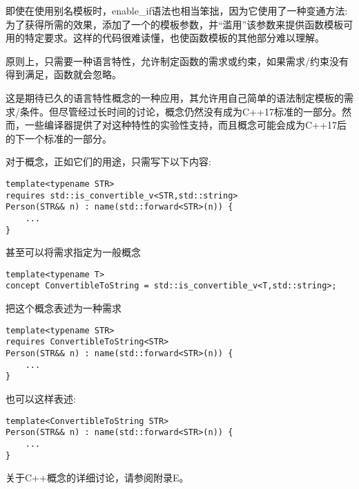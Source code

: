 即使在使用别名模板时，enable\_if语法也相当笨拙，因为它使用了一种变通方法:为了获得所需的效果，添加了一个的模板参数，并“滥用”该参数来提供函数模板可用的特定要求。这样的代码很难读懂，也使函数模板的其他部分难以理解。

原则上，只需要一种语言特性，允许制定函数的需求或约束，如果需求/约束没有得到满足，函数就会忽略。

这是期待已久的语言特性概念的一种应用，其允许用自己简单的语法制定模板的需求/条件。但尽管经过长时间的讨论，概念仍然没有成为C++17标准的一部分。然而，一些编译器提供了对这种特性的实验性支持，而且概念可能会成为C++17后的下一个标准的一部分。

对于概念，正如它们的用途，只需写下以下内容:

\begin{lstlisting}[style=styleCXX]
template<typename STR>
requires std::is_convertible_v<STR,std::string>
Person(STR&& n) : name(std::forward<STR>(n)) {
	...
}
\end{lstlisting}

甚至可以将需求指定为一般概念

\begin{lstlisting}[style=styleCXX]
template<typename T>
concept ConvertibleToString = std::is_convertible_v<T,std::string>;
\end{lstlisting}

把这个概念表述为一种需求

\begin{lstlisting}[style=styleCXX]
template<typename STR>
requires ConvertibleToString<STR>
Person(STR&& n) : name(std::forward<STR>(n)) {
	...
}
\end{lstlisting}

也可以这样表述:

\begin{lstlisting}[style=styleCXX]
template<ConvertibleToString STR>
Person(STR&& n) : name(std::forward<STR>(n)) {
	...
}
\end{lstlisting}

关于C++概念的详细讨论，请参阅附录E。




















